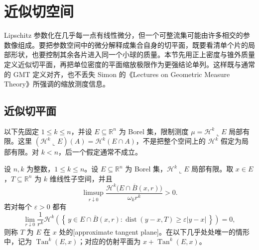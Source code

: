 \section{近似切空间}
\label{b1:sec:1902}

Lipschitz 参数化在几乎每一点有线性微分，但一个可整流集可能由许多相交的参数像组成。要把参数空间中的微分解释成集合自身的切平面，既要看清单个片的局部形状，也要控制其余各片进入同一个小球的质量。本节先用正上密度与锥外质量定义近似切平面，再把单位密度的平面缩放极限作为更强结论单列。这样既与通常的 GMT 定义对齐，也不丢失 Simon 的《Lectures on Geometric Measure Theory》\cite[11.2 DEFINITION, 11.3 REMARK, 11.4 DEFINITION, 11.5 REMARK, and 11.6 THEOREM]{Simon1983Lectures}所强调的缩放测度信息。


\subsection{近似切平面}
\label{b1:subsec:190201}

以下先固定 \(1\leq k\leq n\)，并设 \(E\subseteq\mathbb R^n\) 为 Borel 集，限制测度 \(\mu=\mathcal H^k\llcorner E\) 局部有限。这里 \((\mathcal H^k\llcorner E)(A)=\mathcal H^k(E\cap A)\)，不是把整个空间上的 \(\mathcal H^k\) 假定为局部有限。对 \(k<n\)，后一个假定通常不成立。

\begin{definition}\label{b1:def:approximate-tangent-plane}
设 \(n,k\) 为整数，\(1\leq k\leq n\)。设 \(E\subseteq\mathbb R^n\) 为 Borel 集，\(\mathcal H^k\llcorner E\) 局部有限。取 \(x\in E\)，\(T\subseteq\mathbb R^n\) 为 \(k\) 维线性子空间，并且
\[
 \limsup_{r\downarrow0}
 \frac{\mathcal H^k\bigl(E\cap\overline B(x,r)\bigr)}
      {\omega_kr^k}>0.
\]
若对每个 \(\varepsilon>0\) 都有
\begin{equation}\label{b1:eq:approximate-tangent-cone}
 \lim_{r\downarrow0}\frac1{r^k}\mathcal H^k
 \left(\left\{\,y\in E\cap\overline B(x,r):
  \operatorname{dist}(y-x,T)\geq\varepsilon|y-x|\,\right\}\right)=0,
\end{equation}
则称 \(T\) 为 \(E\) 在 \(x\) 处的[approximate tangent plane]。在以下几乎处处唯一的情形中，记为 \(\operatorname{Tan}^k(E,x)\)；对应的仿射平面为 \(x+\operatorname{Tan}^k(E,x)\)。
\end{definition}

